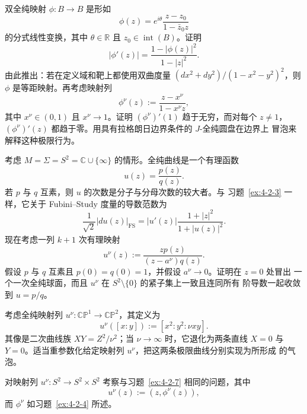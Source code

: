 \begin{exercise}\label{ex:4-2-5}
双全纯映射 $\phi:B\to B$ 是形如
\[
  \phi(z)=e^{i\theta}\frac{z-z_0}{1-\bar z_0z}
\]
的分式线性变换，其中 $\theta\in\mathbb R$ 且 $z_0\in\operatorname{int}(B)$。证明
\[
  |\phi'(z)|=\frac{1-|\phi(z)|^2}{1-|z|^2}.
\]
由此推出：若在定义域和靶上都使用双曲度量
$(dx^2+dy^2)/(1-x^2-y^2)^2$，则 $\phi$ 是等距映射。再考虑映射列
\[
  \phi^\nu(z):=\frac{z-x^\nu}{1-x^\nu z},
\]
其中 $x^\nu\in(0,1)$ 且 $x^\nu\to1$。证明 $(\phi^\nu)'(1)$ 趋于无穷，而对每个
$z\ne1$，$(\phi^\nu)'(z)$ 都趋于零。用具有拉格朗日边界条件的 $J$-全纯圆盘在边界上
冒泡来解释这种极限行为。
\end{exercise}

\begin{exercise}\label{ex:4-2-6}
考虑 $M=\Sigma=S^2=\mathbb C\cup\{\infty\}$ 的情形。全纯曲线是一个有理函数
\[
  u(z)=\frac{p(z)}{q(z)}.
\]
若 $p$ 与 $q$ 互素，则 $u$ 的次数是分子与分母次数的较大者。与
习题~\ref{ex:4-2-3} 一样，它关于 Fubini--Study 度量的导数范数为
\[
  \frac1{\sqrt2}|du(z)|_{\mathrm{FS}}
  =|u'(z)|\frac{1+|z|^2}{1+|u(z)|^2}.
\]
现在考虑一列 $k+1$ 次有理映射
\[
  u^\nu(z):=\frac{zp(z)}{(z-a^\nu)q(z)}.
\]
假设 $p$ 与 $q$ 互素且 $p(0)=q(0)=1$，并假设 $a^\nu\to0$。证明在 $z=0$ 处冒出
一个一次全纯球面，而且 $u^\nu$ 在 $S^2\setminus\{0\}$ 的紧子集上一致且连同所有
阶导数一起收敛到 $u=p/q$。
\end{exercise}

\begin{exercise}\label{ex:4-2-7}
考虑全纯映射列 $u^\nu:\mathbb{CP}^1\to\mathbb{CP}^2$，其定义为
\[
  u^\nu([x:y]):=[x^2:y^2:\nu xy].
\]
其像是二次曲线族 $XY=Z^2/\nu^2$；当 $\nu\to\infty$ 时，它退化为两条直线
$X=0$ 与 $Y=0$。适当重参数化给定映射列 $u^\nu$，把这两条极限曲线分别实现为所形成
的气泡。
\end{exercise}

\begin{exercise}\label{ex:4-2-8}
对映射列 $u^\nu:S^2\to S^2\times S^2$ 考察与习题~\ref{ex:4-2-7} 相同的问题，其中
\[
  u^\nu(z):=(z,\phi^\nu(z)),
\]
而 $\phi^\nu$ 如习题~\ref{ex:4-2-4} 所述。
\end{exercise}

